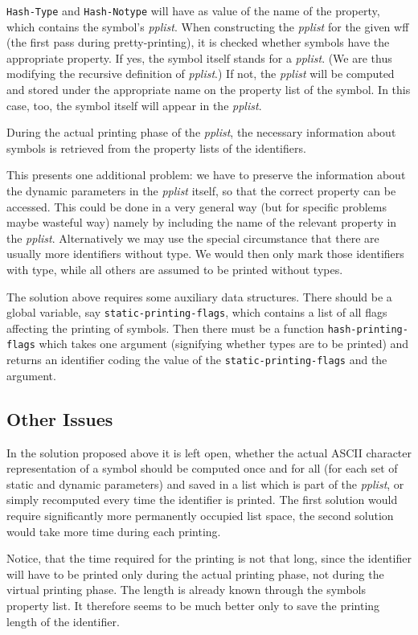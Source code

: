 {\tt Hash-Type} and {\tt Hash-Notype} will have as value of the name of the
property, which contains the symbol's {\it pplist}.  When constructing
the {\it pplist} for the given wff (the first pass during pretty-printing),
it is checked whether symbols have the appropriate property.  If yes,
the symbol itself stands for a {\it pplist}. (We are thus modifying the recursive
definition of {\it pplist}.)  If not, the {\it pplist} will be computed and
stored under the appropriate name on the property list of the symbol.
In this case, too, the symbol itself will appear in the {\it pplist}.

During the actual printing phase of the {\it pplist}, the necessary information
about symbols is retrieved from the property lists of the identifiers.

This presents one additional problem:  we have to preserve the
information about the dynamic parameters in the {\it pplist} itself, so
that the correct property can be accessed.  This could be done  in
a very general way (but for specific problems maybe wasteful way)
namely by including the name of the relevant property in the
{\it pplist}.  Alternatively we may use the special circumstance that
there are usually more identifiers without type.  We would then only
mark those identifiers with type, while all others are assumed to be
printed without types.

The solution above requires some auxiliary data structures.  There
should be a global variable, say {\tt static-printing-flags}, which
contains a list of all flags affecting the printing of symbols.
Then there must be a function {\tt hash-printing-flags} which takes
one argument (signifying whether types are to be printed) and returns
an identifier coding the value of the {\tt static-printing-flags} and
the argument.

\subsection{Other Issues}
In the solution proposed above it is left open, whether the actual
ASCII character representation of a symbol should be computed once and
for all (for each set of static and dynamic parameters) and saved in a
list which is part of the {\it pplist}, or simply recomputed every time
the identifier is printed.  The first solution would require significantly
more permanently occupied list space, the second solution would take
more time during each printing.

Notice, that the time required for the printing is not that long, since
the identifier will have to be printed only during the actual printing
phase, not during the virtual printing phase.  The length is already
known through the symbols property list.  It therefore seems to be much
better only to save the printing length of the identifier.

